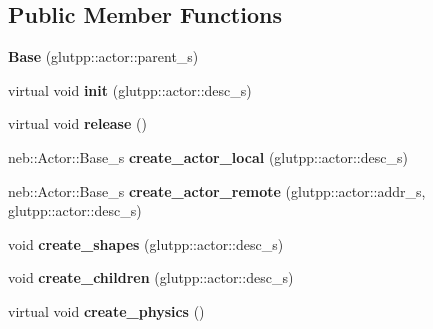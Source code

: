 \subsection*{\-Public \-Member \-Functions}
\begin{DoxyCompactItemize}
\item 
\hypertarget{classneb_1_1Actor_1_1Base_a2476f443f7d6b8c60b3912953eec0842}{{\bfseries \-Base} (glutpp\-::actor\-::parent\-\_\-s)}\label{classneb_1_1Actor_1_1Base_a2476f443f7d6b8c60b3912953eec0842}

\item 
\hypertarget{classneb_1_1Actor_1_1Base_a972bd459843929bd090f093d215d540b}{virtual void {\bfseries init} (glutpp\-::actor\-::desc\-\_\-s)}\label{classneb_1_1Actor_1_1Base_a972bd459843929bd090f093d215d540b}

\item 
\hypertarget{classneb_1_1Actor_1_1Base_aee25af3cd56f3aec8a3e2db274bb0d1d}{virtual void {\bfseries release} ()}\label{classneb_1_1Actor_1_1Base_aee25af3cd56f3aec8a3e2db274bb0d1d}

\item 
\hypertarget{classneb_1_1Actor_1_1Base_a2f335051e5a6f833cad94da551bf9f82}{neb\-::\-Actor\-::\-Base\-\_\-s {\bfseries create\-\_\-actor\-\_\-local} (glutpp\-::actor\-::desc\-\_\-s)}\label{classneb_1_1Actor_1_1Base_a2f335051e5a6f833cad94da551bf9f82}

\item 
\hypertarget{classneb_1_1Actor_1_1Base_a045e31459829bbbb5a49dccf0e7d9b67}{neb\-::\-Actor\-::\-Base\-\_\-s {\bfseries create\-\_\-actor\-\_\-remote} (glutpp\-::actor\-::addr\-\_\-s, glutpp\-::actor\-::desc\-\_\-s)}\label{classneb_1_1Actor_1_1Base_a045e31459829bbbb5a49dccf0e7d9b67}

\item 
\hypertarget{classneb_1_1Actor_1_1Base_ae60a17296d6a2393c7662340673073a6}{void {\bfseries create\-\_\-shapes} (glutpp\-::actor\-::desc\-\_\-s)}\label{classneb_1_1Actor_1_1Base_ae60a17296d6a2393c7662340673073a6}

\item 
\hypertarget{classneb_1_1Actor_1_1Base_a1c6cb73654d5f395c86de63be1f25d1c}{void {\bfseries create\-\_\-children} (glutpp\-::actor\-::desc\-\_\-s)}\label{classneb_1_1Actor_1_1Base_a1c6cb73654d5f395c86de63be1f25d1c}

\item 
\hypertarget{classneb_1_1Actor_1_1Base_a03d72471ba01b7c7df310e02173240e0}{virtual void {\bfseries create\-\_\-physics} ()}\label{classneb_1_1Actor_1_1Base_a03d72471ba01b7c7df310e02173240e0}


\end{DoxyCompactItemize}

